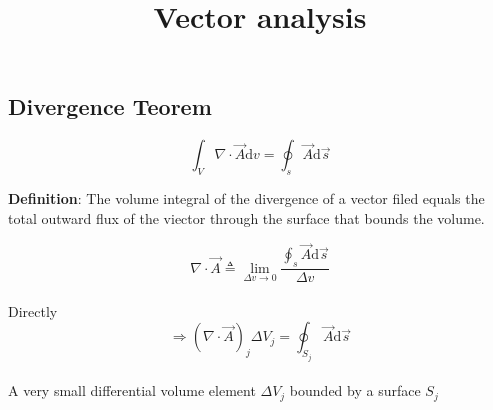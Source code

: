\documentclass[12pt, a4paper]{article}
\title{Vector analysis}
\begin{document}
\subsection*{Divergence Teorem}
$$
\int_{V} \nabla \cdot \vec{A} \text{d}v = \oint_{s} \vec{A} \text{d} \vec{s}
$$

\textbf{Definition}: The volume integral of the divergence of a vector filed equals the total outward flux of the viector through the surface that bounds the volume.

$$
\nabla \cdot \vec{A} \triangleq \lim_{\Delta v \to 0} {\frac{\oint_{s} \vec{A} \text{d} \vec{s}}{\Delta v}}
$$
\\
Directly
$$
\Rightarrow (\nabla \cdot \vec{A})_{j} \Delta V_{j} = \oint_{S_j} \vec{A} \text{d} \vec{s}
$$
\\ 
A very small differential volume element $\Delta V_j$ bounded by a surface $S_j$
\\






\end{document}
